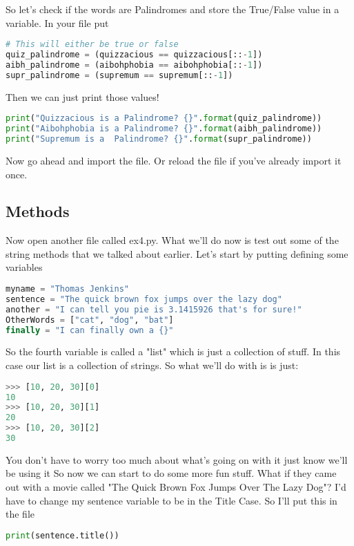 \documentclass{article}
\begin{document}
So let's check if the words are Palindromes and store the True/False value in a variable.
In your file put 
\begin{lstlisting}[language=Python]
# This will either be true or false
quiz_palindrome = (quizzacious == quizzacious[::-1])
aibh_palindrome = (aibohphobia == aibohphobia[::-1])
supr_palindrome = (supremum == supremum[::-1])
\end{lstlisting}

Then we can just print those values!

\begin{lstlisting}[language=Python]
print("Quizzacious is a Palindrome? {}".format(quiz_palindrome))
print("Aibohphobia is a Palindrome? {}".format(aibh_palindrome))
print("Supremum is a  Palindrome? {}".format(supr_palindrome))
\end{lstlisting}

Now go ahead and import the file. 
Or reload the file if you've already import it once. 
\subsection{Methods}

Now open another file called ex4.py.
What we'll do now is test out some of the string methods that we talked about earlier. 
Let's start by putting defining some variables
\begin{lstlisting}[language=Python]
myname = "Thomas Jenkins"
sentence = "The quick brown fox jumps over the lazy dog"
another = "I can tell you pie is 3.1415926 that's for sure!"
OtherWords = ["cat", "dog", "bat"]
finally = "I can finally own a {}"
\end{lstlisting}

So the fourth variable is called a "list" which is just a collection of stuff. 
In this case our list is a collection of strings. 
So what we'll do with is is just:
\begin{lstlisting}[language=Python]
>>> [10, 20, 30][0]
10
>>> [10, 20, 30][1]
20
>>> [10, 20, 30][2]
30
\end{lstlisting}

You don't have to worry too much about what's going on with it just know we'll be using it
So now we can start to do some more fun stuff. 
What if they came out with a movie called "The Quick Brown Fox Jumps Over The Lazy Dog"?
I'd have to change my sentence variable to be in the Title Case. 
So I'll put this in the file
\begin{lstlisting}[language=Python]
print(sentence.title())
\end{lstlisting}
\end{document}

